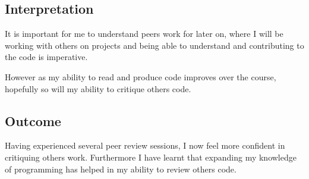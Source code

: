 \documentclass{scrartcl}
\begin{document}
\subsection{Interpretation}

It is important for me to understand peers work for later on, where I will be working with others on projects and being able to understand and contributing to the code is imperative. 

However as my ability to read and produce code improves over the course, hopefully so will my ability to critique others code.

\subsection{Outcome} 

Having experienced several peer review sessions, I now feel more confident in critiquing others work. Furthermore I have learnt that expanding my knowledge of programming has helped in my ability to review others code.
\end{document}
